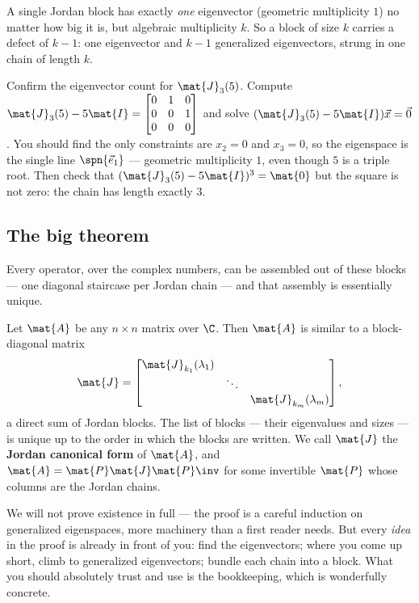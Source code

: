 A single Jordan block has exactly \emph{one} eigenvector (geometric multiplicity $1$) no
matter how big it is, but algebraic multiplicity $k$. So a block of size $k$ carries a
defect of $k-1$: one eigenvector and $k-1$ generalized eigenvectors, strung in one chain
of length $k$.

\begin{labbox}
Confirm the eigenvector count for $\mat{J}_3(5)$. Compute
$\mat{J}_3(5)-5\mat{I}=\begin{bmatrix}0&1&0\\0&0&1\\0&0&0\end{bmatrix}$ and solve
$(\mat{J}_3(5)-5\mat{I})\vec{x}=\vec{0}$. You should find the only constraints are
$x_2=0$ and $x_3=0$, so the eigenspace is the single line $\spn\{\vec{e}_1\}$ ---
geometric multiplicity $1$, even though $5$ is a triple root. Then check that
$(\mat{J}_3(5)-5\mat{I})^3=\mat{0}$ but the square is not zero: the chain has length
exactly $3$.
\end{labbox}

\subsection{The big theorem}

Every operator, over the complex numbers, can be assembled out of these blocks --- one
diagonal staircase per Jordan chain --- and that assembly is essentially unique.

\begin{theorem}
\label{ch28:thm-jordan}
Let $\mat{A}$ be any $n\times n$ matrix over $\C$. Then $\mat{A}$ is similar to a
block-diagonal matrix
\[
\mat{J} = \begin{bmatrix}
\mat{J}_{k_1}(\lambda_1) & & \\
 & \ddots & \\
 & & \mat{J}_{k_m}(\lambda_m)
\end{bmatrix},
\]
a direct sum of Jordan blocks. The list of blocks --- their eigenvalues and sizes --- is
unique up to the order in which the blocks are written. We call $\mat{J}$ the
\textbf{Jordan canonical form} of $\mat{A}$, and $\mat{A}=\mat{P}\mat{J}\mat{P}\inv$ for
some invertible $\mat{P}$ whose columns are the Jordan chains.
\end{theorem}

We will not prove existence in full --- the proof is a careful induction on generalized
eigenspaces, more machinery than a first reader needs. But every \emph{idea} in the proof
is already in front of you: find the eigenvectors; where you come up short, climb to
generalized eigenvectors; bundle each chain into a block. What you should absolutely
trust and use is the bookkeeping, which is wonderfully concrete.

